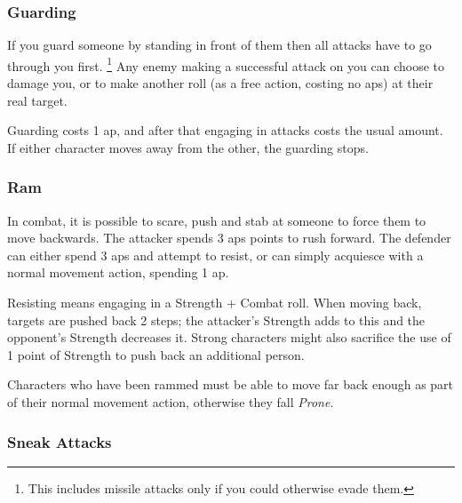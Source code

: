\begin{multicols}{2}
\subsubsection[Guard: Someone must successfully hit you before they are allowed to hit whomever you are guarding. Cost: 1 \gls{ap}]{Guarding}

If you guard someone by standing in front of them then all attacks have to go through you first.%
\footnote{This includes missile attacks only if you could otherwise evade them.}
Any enemy making a successful attack on you can choose to damage you, or to make another roll (as a free action, costing no \glspl{ap}) at their real target.

Guarding costs 1 \gls{ap}, and after that engaging in attacks costs the usual amount.
If either character moves away from the other, the guarding stops.

\subsubsection[Ram: Push the enemy back 2 steps plus the difference between your Strength Bonuses. Resisting costs 2 \glspl{ap}, and requires a resisted Strength + Combat roll. Cost: 3 \glspl{ap}]{Ram}
\label{ram}

In combat, it is possible to scare, push and stab at someone to force them to move backwards.
The attacker spends 3 \glspl{ap} points to rush forward.
The defender can either spend 3 \glspl{ap} and attempt to resist, or can simply acquiesce with a normal movement action, spending 1 \gls{ap}.

Resisting means engaging in a Strength + Combat roll.
When moving back, targets are pushed back 2 steps; the attacker's Strength adds to this and the opponent's Strength decreases it.
Strong characters might also sacrifice the use of 1 point of Strength to push back an additional person.

Characters who have been rammed must be able to move far back enough as part of their normal movement action, otherwise they fall \textit{Prone}.

\subsubsection[Sneak Attack: Dexterity + Stealth vs Wits + Vigilance; automatic \glsentrytext{vitalShot} with +2 Damage.]{Sneak Attacks}
\label{sneakattack}


\end{multicols}
